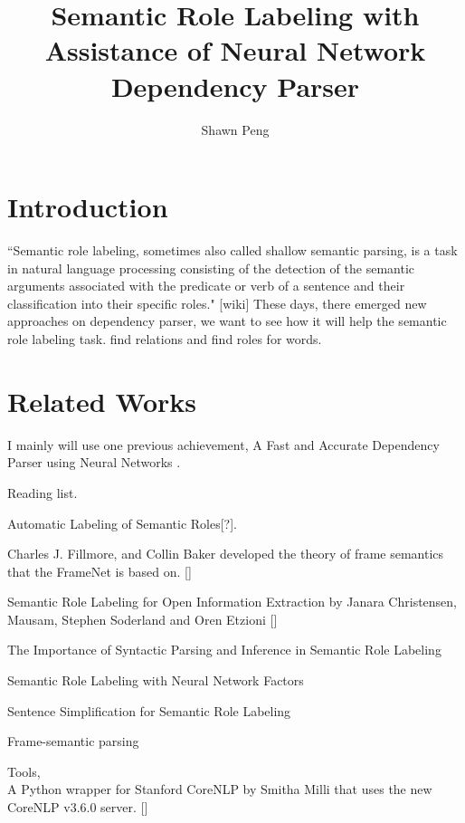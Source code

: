 \documentclass[letterpaper]{article}
\title{Semantic Role Labeling with Assistance of Neural Network Dependency Parser}
\author{Shawn Peng}
\begin{document}
	
	\maketitle
	
	\flushleft
		
	\section{Introduction}
	``Semantic role labeling, sometimes also called shallow semantic parsing, is a task in natural language processing consisting of the detection of the semantic arguments associated with the predicate or verb of a sentence and their classification into their specific roles." [wiki]
	These days, there emerged new approaches on dependency parser, we want to see how it will help the semantic role labeling task.
	find relations and find roles for words.
	
	
	
	\section{Related Works}
	I mainly will use one previous achievement, A Fast and Accurate Dependency Parser using Neural Networks \cite{manning-EtAl:2014:P14-5}.

	\bigskip
	Reading list.
	
		\bigskip
	Automatic Labeling of Semantic Roles[?].

	\bigskip
	Charles J. Fillmore, and Collin Baker developed the theory of frame semantics that the FrameNet is based on. []
	
		\bigskip
	Semantic Role Labeling for Open Information Extraction by Janara Christensen, Mausam, Stephen Soderland and Oren Etzioni []
	
		\bigskip
	The Importance of Syntactic Parsing and	Inference in Semantic Role Labeling \cite{Punyakanok}
	
		\bigskip
	Semantic Role Labeling with Neural Network Factors \cite{FitzGerald2015SemanticRL}
	
		\bigskip
	Sentence Simplification for Semantic Role Labeling \cite{Woodsend:2014:TRI:2750423.2750426}
	
		\bigskip
	Frame-semantic parsing \cite{Das:2014}
	
	\bigskip
	Tools,\\
		A Python wrapper for Stanford CoreNLP by Smitha Milli that uses the new CoreNLP v3.6.0 server. []
	
\end{document}
